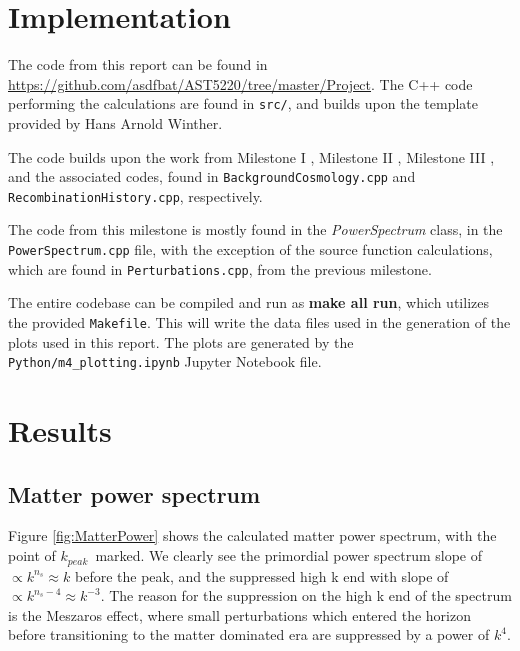 \documentclass[10pt, a4paper]{article}
\begin{document}
\section{Implementation}
The code from this report can be found in \url{https://github.com/asdfbat/AST5220/tree/master/Project}. The C++ code performing the calculations are found in \texttt{src/}, and builds upon the template provided by Hans Arnold Winther.

The code builds upon the work from Milestone I \cite{Milestone1}, Milestone II \cite{Milestone2}, Milestone III \cite{Milestone3}, and the associated codes, found in \texttt{BackgroundCosmology.cpp} and \texttt{RecombinationHistory.cpp}, respectively.

The code from this milestone is mostly found in the \textit{PowerSpectrum} class, in the \texttt{PowerSpectrum.cpp} file, with the exception of the source function calculations, which are found in \texttt{Perturbations.cpp}, from the previous milestone.

The entire codebase can be compiled and run as \textbf{make all run}, which utilizes the provided \texttt{Makefile}. This will write the data files used in the generation of the plots used in this report. The plots are generated by the \texttt{Python/m4\_plotting.ipynb} Jupyter Notebook file.



\section{Results}
\subsection{Matter power spectrum}
Figure \ref{fig:MatterPower} shows the calculated matter power spectrum, with the point of $k_{peak}$ marked. We clearly see the primordial power spectrum slope of $\propto k^{n_s} \approx k$ before the peak, and the suppressed high k end with slope of $\propto k^{n_s-4} \approx k^{-3}$. The reason for the suppression on the high k end of the spectrum is the Meszaros effect, where small perturbations which entered the horizon before transitioning to the matter dominated era are suppressed by a power of $k^4$.
\end{document}
